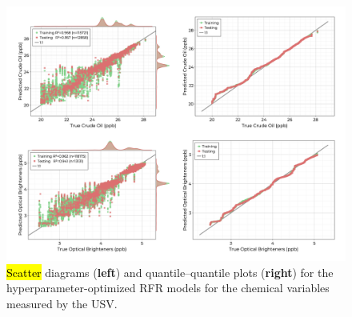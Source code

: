\documentclass[remotesensing,article,accept,pdftex,moreauthors]{Definitions/mdpi}
\begin{document}
\begin{figure}[H]

\vspace{-0.21in}
\hspace{-6pt}\includegraphics[width=\columnwidth]{figures/results/fits/chemical-fitres.png}
\vspace{-0.11in}
\caption{\hl{Scatter} %
 diagrams (\textbf{left}) and quantile--quantile plots (\textbf{right}) for the hyperparameter-optimized RFR models for the chemical variables measured by the USV.\label{fig:chemicals-fit}}
\end{figure}  
\end{document}
